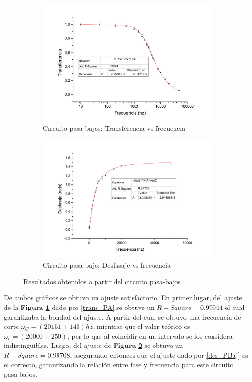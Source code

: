 \documentclass[11pt,a4paper]{article}
\begin{document}
\begin{figure}[h]
\begin{subfigure}{0.5\textwidth}
\includegraphics[scale=0.34]{PB_TRANSFERENCIA}
  \caption{Circuito pasa-bajos: Transferencia vs frecuencia }
  \label{subfig:PB.a}
\end{subfigure}
\begin{subfigure}{0.5\textwidth}
\includegraphics[scale=0.34]{PB_DESFASAJE}
  \caption{Circuito pasa-bajo: Desfasaje vs frecuencia}
  \label{subfig:PB.b}
\end{subfigure}
  \caption{Resultados obtenidos a partir del circuito pasa-bajos}
  \label{fig:PB}
\end{figure}


De ambos gráficos se obtuvo un ajuste satisfactorio. En primer lugar, del ajuste de la \textbf{Figura \ref{subfig:PB.a}} dado por \eqref{trans_PA} se obtuve un $R-Square = 0.99944$ el cual garantizaba la bondad del ajuste. A partir del cual se obtuvo una frecuencia de corte $\omega_C = (20151 \pm 140) hz$, mientras que el valor teórico es $\omega_c = (20000 \pm 250)$, por lo que al coincidir en un intervalo se los considera indistinguibles. Luego, del ajuste de \textbf{Figura \ref{subfig:PB.b}} se obtuvo un $R-Square=0.99708$, asegurando entonces que el ajuste dado por \eqref{des_PBaj} es el correcto, garantizando la relación entre fase y frecuencia para este circuito pasa-bajos.
\end{document}
